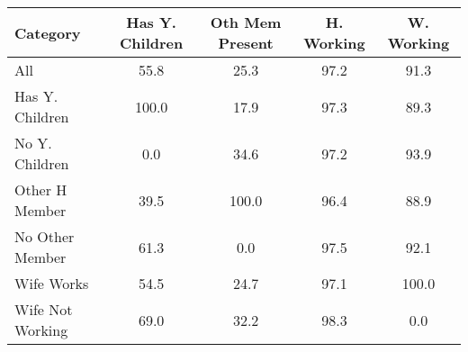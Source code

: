 \begin{tabular}{lcccc}
\hline\hline
\textbf{Category} & \textbf{Has Y. Children} & \textbf{Oth Mem Present} & \textbf{H. Working} & \textbf{W. Working} \\
\hline
All               & 55.8                     & 25.3                     & 97.2                & 91.3                \\
Has Y. Children    & 100.0                    & 17.9                     & 97.3                & 89.3                \\
No Y. Children     & 0.0                      & 34.6                     & 97.2                & 93.9                \\
Other H Member     & 39.5                     & 100.0                    & 96.4                & 88.9                \\
No Other Member    & 61.3                     & 0.0                      & 97.5                & 92.1                \\
Wife Works         & 54.5                     & 24.7                     & 97.1                & 100.0               \\
Wife Not Working   & 69.0                     & 32.2                     & 98.3                & 0.0                 \\
\hline\hline
\end{tabular}
